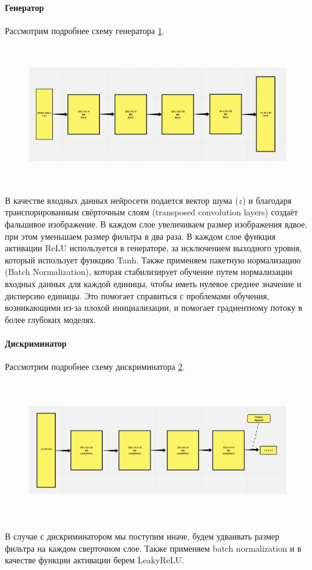 \paragraph{Генератор}

Рассмотрим подробнее схему генератора {\color{blue} \ref{fig.generator_scheme_DCGAN}}.
\begin{figure}
    \centering
    \includegraphics[height=60mm]{fig/generator_scheme_DCGAN.png}
    \caption{}
    \label{fig.generator_scheme_DCGAN}
\end{figure}
В качестве входных данных нейросети подается вектор шума ($z$) и благодаря транспорированным свёрточным слоям (transposed convolution layers) создаёт фальшивое изображение. В каждом слое увеличиваем размер изображения вдвое, при этом уменьшаем размер фильтра в два раза. В каждом слое функция активации ReLU используется в генераторе, за исключением выходного уровня, который использует функцию Tanh.
Также применяем пакетную нормализацию (Batch Normalization), которая стабилизирует обучение путем нормализации входных данных для каждой единицы, чтобы иметь нулевое среднее значение и дисперсию единицы. Это помогает справиться с проблемами обучения, возникающими из-за плохой инициализации, и помогает градиентному потоку в более глубоких моделях.

\paragraph{Дискриминатор}

Рассмотрим подробнее схему дискриминатора {\color{blue} \ref{fig.discriminator_scheme_DCGAN}}.
\begin{figure}
    \centering
    \includegraphics[height=60mm]{fig/discriminator_scheme_DCGAN.png}
    \caption{}
    \label{fig.discriminator_scheme_DCGAN}
\end{figure}
В случае с дискриминатором мы поступим иначе, будем удваивать размер фильтра на каждом сверточном слое. Также применяем batch normalization и в качестве функции активации берем LeakyReLU.

